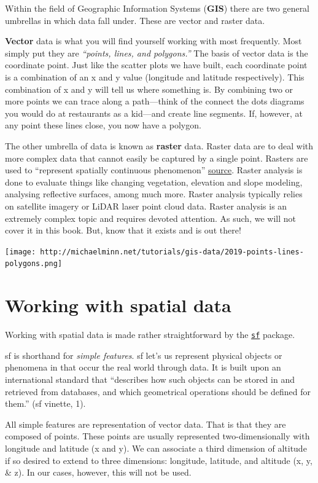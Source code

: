 \documentclass[
]{book}
\begin{document}
Within the field of Geographic Information Systems (\textbf{GIS}) there are two general umbrellas in which data fall under. These are vector and raster data.

\textbf{Vector} data is what you will find yourself working with most frequently. Most simply put they are \emph{``points, lines, and polygons.''} The basis of vector data is the coordinate point. Just like the scatter plots we have built, each coordinate point is a combination of an x and y value (longitude and latitude respectively). This combination of x and y will tell us where something is. By combining two or more points we can trace along a path---think of the connect the dots diagrams you would do at restaurants as a kid---and create line segments. If, however, at any point these lines close, you now have a polygon.

The other umbrella of data is known as \textbf{raster} data. Raster data are to deal with more complex data that cannot easily be captured by a single point. Rasters are used to ``represent spatially continuous phenomenon'' \href{https://rspatial.org/raster/spatial/Spatialdata.pdf}{source}. Raster analysis is done to evaluate things like changing vegetation, elevation and slope modeling, analysing reflective surfaces, among much more. Raster analysis typically relies on satellite imagery or LiDAR laser point cloud data. Raster analysis is an extremely complex topic and requires devoted attention. As such, we will not cover it in this book. But, know that it exists and is out there!

\texttt{[image: http://michaelminn.net/tutorials/gis-data/2019-points-lines-polygons.png]}

\hypertarget{working-with-spatial-data}{%
\section{Working with spatial data}\label{working-with-spatial-data}}

Working with spatial data is made rather straightforward by the \href{https://github.com/r-spatial/sf}{\texttt{sf}} package.

sf is shorthand for \emph{simple features}. sf let's us represent physical objects or phenomena in that occur the real world through data. It is built upon an international standard that ``describes how such objects can be stored in and retrieved from databases, and which geometrical operations should be defined for them.'' (sf vinette, 1).

All simple features are representation of vector data. That is that they are composed of points. These points are usually represented two-dimensionally with longitude and latitude (x and y). We can associate a third dimension of altitude if so desired to extend to three dimensions: longitude, latitude, and altitude (x, y, \& z). In our cases, however, this will not be used.
\end{document}

